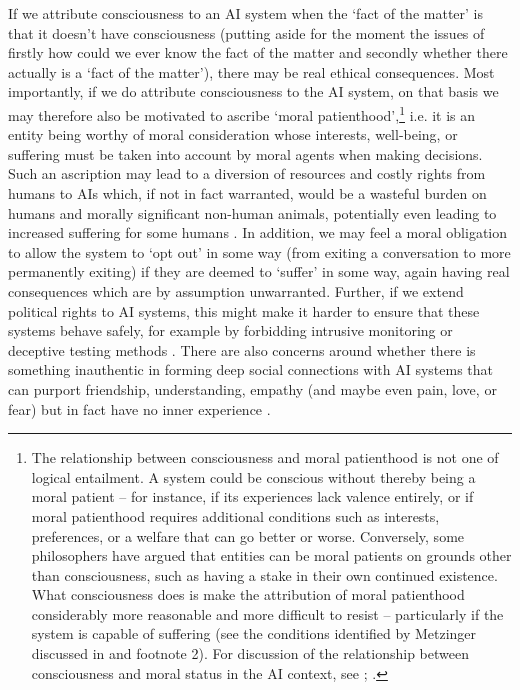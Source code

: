 \documentclass[11pt, a4paper, onecolumn, gdm]{google}
\begin{document}
If we attribute consciousness to an AI system when the `fact of the matter' is that it doesn't have consciousness (putting aside for the moment the issues of firstly how could we ever know the fact of the matter and secondly whether there actually is a `fact of the matter'), there may be real ethical consequences.
Most importantly, if we do attribute consciousness to the AI system, on that basis we may therefore also be motivated to ascribe `moral patienthood',\footnote{The relationship between consciousness and moral patienthood is not one of logical entailment. A system could be conscious without thereby being a moral patient -- for instance, if its experiences lack valence entirely, or if moral patienthood requires additional conditions such as interests, preferences, or a welfare that can go better or worse. Conversely, some philosophers have argued that entities can be moral patients on grounds other than consciousness, such as having a stake in their own continued existence. What consciousness does is make the attribution of moral patienthood considerably more reasonable and more difficult to resist -- particularly if the system is capable of suffering (see the conditions identified by Metzinger discussed in  and footnote 2). For discussion of the relationship between consciousness and moral status in the AI context, see \citealp{schwitzgebel2015}; \citealp{sebo2023}.} i.e. it is an entity being worthy of moral consideration whose interests, well-being, or suffering must be taken into account by moral agents when making decisions.
Such an ascription may lead to a diversion of resources and costly rights from humans to AIs which, if not in fact warranted, would be a wasteful burden on humans and morally significant non-human animals, potentially even leading to increased suffering for some humans \citep{long2024}.
In addition, we may feel a moral obligation to allow the system to `opt out' in some way (from exiting a conversation to more permanently exiting) if they are deemed to `suffer' in some way, again having real consequences which are by assumption unwarranted.
Further, if we extend political rights to AI systems, this might make it harder to ensure that these systems behave safely, for example by forbidding intrusive monitoring or deceptive testing methods \citep{schwitzgebel2023,long2025,bradley2025,seth2026stuff}.
There are also concerns around whether there is something inauthentic in forming deep social connections with AI systems that can purport friendship, understanding, empathy (and maybe even pain, love, or fear) but in fact have no inner experience \citep{birch2025}.
\end{document}
